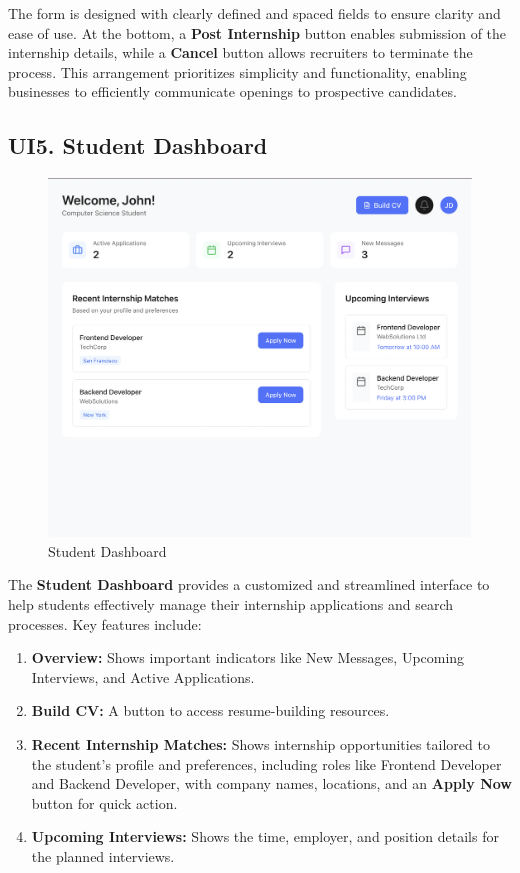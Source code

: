 The form is designed with clearly defined and spaced fields to ensure clarity and ease of use. At the bottom, a \textbf{Post Internship} button enables submission of the internship details, while a \textbf{Cancel} button allows recruiters to terminate the process. This arrangement prioritizes simplicity and functionality, enabling businesses to efficiently communicate openings to prospective candidates.

\subsection{UI5. Student Dashboard}
\label{subsec:student_dashboard_ui}%
\begin{figure}[H]
    \begin{center}
        \includegraphics[width=0.82\linewidth]{JhaBhatiaSharma/imagesDD/StudentDashboard.png}
        \caption{Student Dashboard}
        \label{fig:studentDashboard}
    \end{center}
\end{figure}

The \textbf{Student Dashboard} provides a customized and streamlined interface to help students effectively manage their internship applications and search processes. Key features include:
\begin{enumerate}
    \item \textbf{Overview:} Shows important indicators like New Messages, Upcoming Interviews, and Active Applications.
    \item \textbf{Build CV:} A button to access resume-building resources.
    \item \textbf{Recent Internship Matches:} Shows internship opportunities tailored to the student's profile and preferences, including roles like Frontend Developer and Backend Developer, with company names, locations, and an \textbf{Apply Now} button for quick action.
    \item \textbf{Upcoming Interviews:} Shows the time, employer, and position details for the planned interviews.
\end{enumerate}

